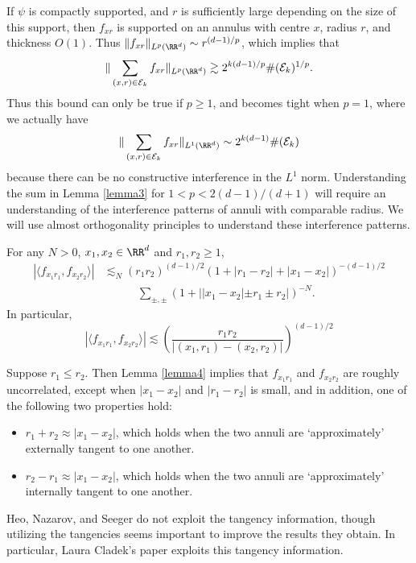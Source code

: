 If $\psi$ is compactly supported, and $r$ is sufficiently large depending on the size of this support, then $f_{xr}$ is supported on an annulus with centre $x$, radius $r$, and thickness $O(1)$. Thus $\| f_{xr} \|_{L^p(\RR^d)} \sim r^{(d-1)/p}$, which implies that
%
\[ \| \sum_{(x,r) \in \mathcal{E}_k} f_{xr} \|_{L^p(\RR^d)} \gtrsim 2^{k(d-1)/p} \#(\mathcal{E}_k)^{1/p}. \]
%
Thus this bound can only be true if $p \geq 1$, and becomes tight when $p = 1$, where we actually have
%
\[ \| \sum_{(x,r) \in \mathcal{E}_k} f_{xr} \|_{L^1(\RR^d)} \sim 2^{k(d-1)} \#(\mathcal{E}_k) \]
%
because there can be no constructive interference in the $L^1$ norm. Understanding the sum in Lemma \ref{lemma3} for $1 < p < 2(d-1)/(d+1)$ will require an understanding of the interference patterns of annuli with comparable radius. We will use almost orthogonality principles to understand these interference patterns.

\begin{lemma} \label{lemma4}
    For any $N > 0$, $x_1,x_2 \in \RR^d$ and $r_1,r_2 \geq 1$,
    \begin{align*}
        |\langle f_{x_1r_1}, f_{x_2r_2} \rangle| &\lesssim_N (r_1r_2)^{(d-1)/2} (1 + |r_1 - r_2| + |x_1 - x_2|)^{-(d-1)/2}\\
        &\quad\quad\quad\sum_{\pm,\pm} (1 + ||x_1 - x_2| \pm r_1 \pm r_2|)^{-N}.
    \end{align*}
    In particular,
    \[ |\langle f_{x_1r_1}, f_{x_2r_2} \rangle| \lesssim \left( \frac{r_1r_2}{|(x_1,r_1) - (x_2,r_2)|} \right)^{(d-1)/2} \]
\end{lemma}

\begin{remark}
    Suppose $r_1 \leq r_2$. Then Lemma \ref{lemma4} implies that $f_{x_1r_1}$ and $f_{x_2r_2}$ are roughly uncorrelated, except when $|x_1 - x_2|$ and $|r_1 - r_2|$ is small, and in addition, one of the following two properties hold:
    \begin{itemize}
        \item $r_1 + r_2 \approx |x_1 - x_2|$, which holds when the two annuli are `approximately' externally tangent to one another.

        \item $r_2 - r_1 \approx |x_1 - x_2|$, which holds when the two annuli are `approximately' internally tangent to one another.
    \end{itemize}
    Heo, Nazarov, and Seeger do not exploit the tangency information, though utilizing the tangencies seems important to improve the results they obtain. In particular, Laura Cladek's paper exploits this tangency information.
\end{remark}

